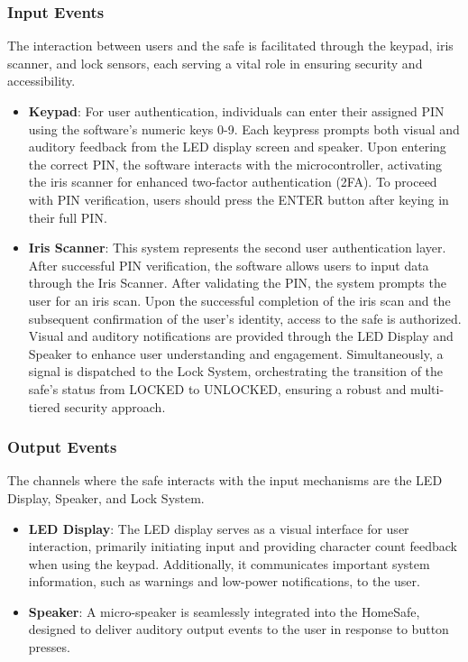 \documentclass{article}
\begin{document}
\subsubsection{Input Events}
The interaction between users and the safe is facilitated through the keypad, iris scanner, and lock sensors, each serving a vital role in ensuring security and accessibility.

\begin{itemize}
    \item \textbf{Keypad}: For user authentication, individuals can enter their assigned PIN using the software's numeric keys 0-9. Each keypress prompts both visual and auditory feedback from the LED display screen and speaker. Upon entering the correct PIN, the software interacts with the microcontroller, activating the iris scanner for enhanced two-factor authentication (2FA). To proceed with PIN verification, users should press the ENTER button after keying in their full PIN.
    \item \textbf{Iris Scanner}: This system represents the second user authentication layer. After successful PIN verification, the software allows users to input data through the Iris Scanner. After validating the PIN, the system prompts the user for an iris scan. Upon the successful completion of the iris scan and the subsequent confirmation of the user's identity, access to the safe is authorized. Visual and auditory notifications are provided through the LED Display and Speaker to enhance user understanding and engagement. Simultaneously, a signal is dispatched to the Lock System, orchestrating the transition of the safe's status from LOCKED to UNLOCKED, ensuring a robust and multi-tiered security approach.
\end{itemize}

\subsubsection{Output Events}
The channels where the safe interacts with the input mechanisms are the LED Display, Speaker, and Lock System.
\begin{itemize}
    \item \textbf{LED Display}: The LED display serves as a visual interface for user interaction, primarily initiating input and providing character count feedback when using the keypad. Additionally, it communicates important system information, such as warnings and low-power notifications, to the user.
    \item \textbf{Speaker}: A micro-speaker is seamlessly integrated into the HomeSafe, designed to deliver auditory output events to the user in response to button presses.
\end{itemize}
\end{document}
